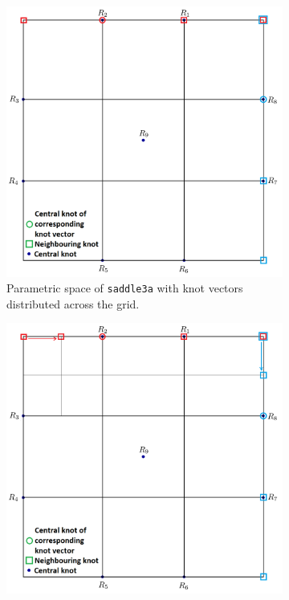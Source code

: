 \documentclass{article}
\begin{document}
\begin{figure}[H]
\centering
\begin{subfigure}[b]{0.31\textwidth}
\includegraphics[width=\textwidth]{saddle3aparam}
\caption{Parametric space of \texttt{saddle3a} with knot vectors distributed across the grid.}
\label{saddle3ap}
\end{subfigure}
\begin{subfigure}[b]{0.31\textwidth}
\includegraphics[width=\textwidth]{saddle3bparam}

\end{subfigure}
\end{figure}
\end{document}
